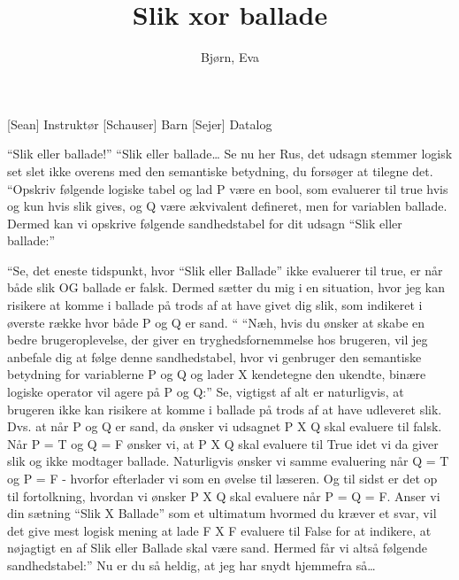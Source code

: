 \documentclass[a4paper,11pt]{article}
\title{Slik xor ballade}
\author{Bjørn, Eva}
\begin{document}
\maketitle

\begin{roles}
 [Sean] Instruktør
[Schauser] Barn
[Sejer] Datalog
\end{roles}

\begin{props}
\end{props}


\begin{sketch}

“Slik eller ballade!”
“Slik eller ballade… Se nu her Rus, det udsagn stemmer logisk set slet ikke overens med den semantiske betydning, du forsøger at tilegne det.
“Opskriv følgende logiske tabel og lad P være en bool, som evaluerer til true hvis og kun hvis slik gives, og Q være ækvivalent defineret, men for variablen ballade. Dermed kan vi opskrive følgende sandhedstabel for dit udsagn “Slik eller ballade:”

 “Se, det eneste tidspunkt, hvor “Slik eller Ballade” ikke evaluerer til true, er når både slik OG ballade er falsk. Dermed sætter du mig i en situation, hvor jeg kan risikere at komme i ballade på trods af at have givet dig slik, som indikeret i øverste række hvor både P og Q er sand. “
 “Næh, hvis du ønsker at skabe en bedre brugeroplevelse, der giver en tryghedsfornemmelse hos brugeren, vil jeg anbefale dig at følge denne sandhedstabel, hvor vi genbruger den semantiske betydning for variablerne P og Q og lader X kendetegne den ukendte, binære logiske operator vil agere på P og Q:”
  Se, vigtigst af alt er naturligvis, at brugeren ikke kan risikere at komme i ballade på trods af at have udleveret slik. Dvs. at når P og Q er sand, da ønsker vi udsagnet P X Q skal evaluere til falsk. Når P = T og Q = F ønsker vi, at P X Q skal evaluere til True idet vi da giver slik og ikke modtager ballade. Naturligvis ønsker vi samme evaluering når Q = T og P = F - hvorfor efterlader vi som en øvelse til læseren.
 Og til sidst er det op til fortolkning, hvordan vi ønsker P X Q skal evaluere når P = Q = F. Anser vi din sætning “Slik X Ballade” som et ultimatum hvormed du kræver et svar, vil det give mest logisk mening at lade F X F evaluere til False for at indikere, at nøjagtigt en af Slik eller Ballade skal være sand. Hermed får vi altså følgende sandhedstabel:”
 Nu er du så heldig, at jeg har snydt hjemmefra så…


\end{sketch}
\end{document}
